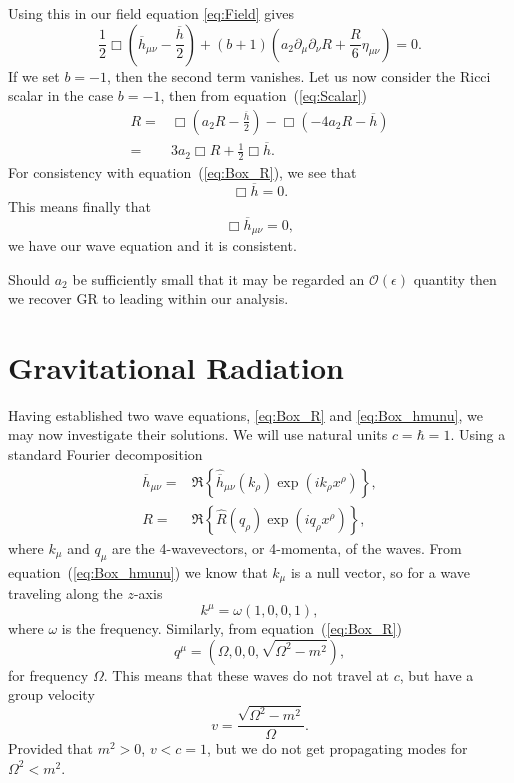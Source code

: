 \documentclass[a4paper, 11pt, titlepage, twoside]{report}
\newcommand{\eqnref}[1]{equation~(\ref{eq:#1})}
\newcommand{\order}[1]{\ensuremath{\mathcal{O}({#1})}}
\begin{document}
Using this in our field equation \eqref{eq:Field} gives
\begin{equation}
\frac{1}{2}\Box\left(\overline{h}_{\mu\nu} - \frac{\overline{h}}{2}\right) + (b + 1)\left(a_2\partial_\mu\partial_\nu R + \frac{R}{6}\eta_{\mu\nu}\right) = 0.
\end{equation}
If we set $b = -1$, then the second term vanishes. Let us now consider the Ricci scalar in the case $b = -1$, then from \eqnref{Scalar}
\begin{align}
R = {} & \Box \left(a_2 R -\frac{\overline{h}}{2}\right) - \Box (-4 a_2 R - \overline{h}) \nonumber \\
 = {} & 3a_2 \Box R + \frac{1}{2}\Box \overline{h}.
\label{eq:Ricci_Box_h}
\end{align}
For consistency with \eqnref{Box_R}, we see that
\begin{equation}
\Box \overline{h} = 0.
\label{eq:Box_h}
\end{equation}
This means finally that
\begin{equation}
\Box \overline{h}_{\mu\nu} = 0,
\label{eq:Box_hmunu}
\end{equation}
we have our wave equation and it is consistent.

Should $a_2$ be sufficiently small that it may be regarded an $\order{\epsilon}$ quantity then we recover GR to leading within our analysis.

\section{Gravitational Radiation}

Having established two wave equations, \eqref{eq:Box_R} and \eqref{eq:Box_hmunu}, we may now investigate their solutions. We will use natural units $c = \hbar = 1$. Using a standard Fourier decomposition
\begin{align}
\overline{h}_{\mu\nu} = {} & \Re\left\{\hat{\overline{h}}_{\mu\nu}(k_\rho) \exp\left(ik_\rho x^\rho\right)\right\},\\
R = {} & \Re\left\{\hat{R}(q_\rho) \exp\left(iq_\rho x^\rho\right)\right\},
\end{align}
where $k_\mu$ and $q_\mu$ are the 4-wavevectors, or 4-momenta, of the waves. From \eqnref{Box_hmunu} we know that $k_\mu$ is a null vector, so for a wave traveling along the $z$-axis
\begin{equation}
k^\mu = \omega(1, 0, 0, 1),
\end{equation}
where $\omega$ is the frequency. Similarly, from \eqnref{Box_R}
\begin{equation}
q^\mu = (\Omega, 0, 0, \sqrt{\Omega^2 - m^2}),
\label{eq:Ricci_q}
\end{equation}
for frequency $\Omega$. This means that these waves do not travel at $c$, but have a group velocity
\begin{equation}
v = \frac{\sqrt{\Omega^2 - m^2}}{\Omega}.
\end{equation}
Provided that $m^2 > 0$, $v < c = 1$, but we do not get propagating modes for $\Omega^2 < m^2$.
\end{document}
